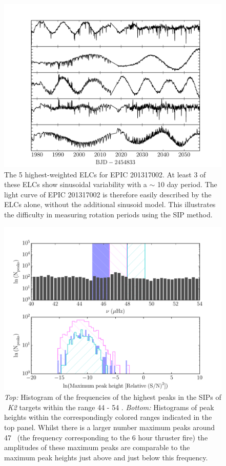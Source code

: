 \documentclass[useAMS, usenatbib, preprint, 12pt]{aastex}
\begin{document}
\begin{figure}
\begin{center}
\includegraphics[width=6in, clip=true]{201317002_top5.pdf}
\caption{The 5 highest-weighted ELCs for EPIC 201317002. At least 3 of these
	ELCs show sinusoidal variability with a $\sim$ 10 day period.
	The light curve of EPIC 201317002 is therefore easily described by the
	ELCs alone, without the additional sinusoid model.
	This illustrates the difficulty in measuring rotation periods using the
	SIP method.}
\label{fig:top5}
\end{center}
\end{figure}

\begin{figure}
\begin{center}
\includegraphics[width=6in, clip=true]{sip_hist.pdf}
\caption{{\it Top:} Histogram of the frequencies of the highest peaks in the
	SIPs of \nGO\ {\it K2} targets within the range 44 - 54 \uHz.
	{\it Bottom:} Histograms of peak heights within the correspondingly
	colored ranges indicated in the top panel.
	Whilst there is a larger number maximum peaks around 47 \uHz\ (the
	frequency corresponding to the 6 hour thruster fire) the amplitudes of
	these maximum peaks are comparable to the maximum peak heights just
	above and just below this frequency.}
\label{fig:sip_hist}
\end{center}
\end{figure}
\end{document}
